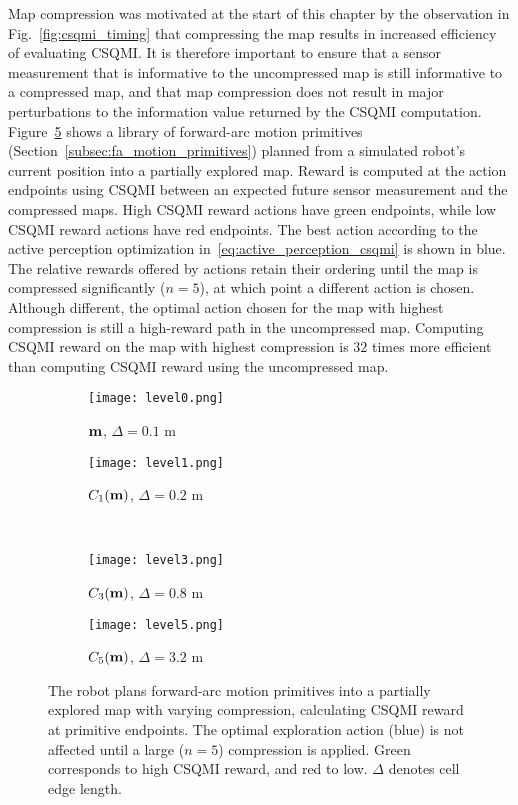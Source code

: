Map compression was motivated at the start of this chapter by the observation in
Fig.~\ref{fig:csqmi_timing} that compressing the map results in increased
efficiency of evaluating CSQMI. It is therefore important to ensure that
a sensor measurement that is informative to the uncompressed map is still
informative to a compressed map, and that map compression does not result in
major perturbations to the information value returned
by the CSQMI computation. Figure~\ref{fig:pri_result2} shows a library of
forward-arc motion primitives (Section~\ref{subsec:fa_motion_primitives})
planned from a simulated robot's current position into a partially explored map.
Reward is computed at the action endpoints using CSQMI between an expected future sensor
measurement and the compressed maps. High CSQMI reward actions have green
endpoints, while low CSQMI reward actions have red endpoints. The best action
according to the active perception optimization in~\eqref{eq:active_perception_csqmi} is shown
in blue. The relative rewards offered by actions retain their ordering until
the map is compressed significantly ($n=5$), at which point a different action
is chosen. Although different, the optimal action chosen for the map with
highest compression is still a high-reward path in the uncompressed
map. Computing CSQMI reward on the map with highest compression is $32$ times
more efficient than computing CSQMI reward using the uncompressed map.

\begin{figure}
  \centering
  \begin{subfigure}[t]{0.48\textwidth}
    \centering
    \texttt{[image: level0.png]}
    \caption{$\mathbf{m}$, $\Delta = 0.1$ m \label{fig:pri_result2_a}}
  \end{subfigure}
  \hfill
  \begin{subfigure}[t]{0.48\textwidth}
    \centering
    \texttt{[image: level1.png]}
    \caption{$C_{1}(\mathbf{m})$, $\Delta = 0.2$ m \label{fig:pri_result2_b}}
  \end{subfigure}
  \\
  \begin{subfigure}[t]{0.48\textwidth}
    \centering
    \texttt{[image: level3.png]}
    \caption{$C_{3}(\mathbf{m})$, $\Delta = 0.8$ m \label{fig:pri_result2_c}}
  \end{subfigure}
  \begin{subfigure}[t]{0.48\textwidth}
    \centering
    \texttt{[image: level5.png]}
    \caption{$C_{5}(\mathbf{m})$, $\Delta = 3.2$ m \label{fig:pri_result2_d}}
  \end{subfigure}
  \caption[Effects of map compression on CSQMI reward.]{The robot plans forward-arc motion primitives into a partially explored map with
    varying compression, calculating CSQMI reward at primitive endpoints. The optimal
    exploration action (blue) is not affected until a large ($n=5$) compression is
    applied. Green corresponds to high CSQMI reward, and red to low. $\Delta$
  denotes cell edge length. \label{fig:pri_result2}}
\end{figure}

